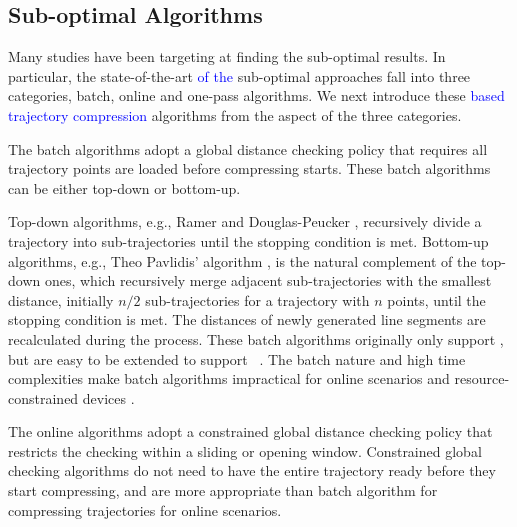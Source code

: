 \vspace{-1ex}
\subsection{Sub-optimal Algorithms}
Many studies have been targeting at finding the sub-optimal results.
In particular, the state-of-the-art \textcolor{blue}{of the} sub-optimal \lsa approaches fall into three categories, \ie batch, online and one-pass algorithms.
We next introduce these \lsa \textcolor{blue}{based trajectory compression} algorithms from the aspect of the three categories.

The batch algorithms adopt a global distance checking policy that requires all trajectory points are loaded before compressing starts.
These batch algorithms can be either top-down or bottom-up.

Top-down algorithms, e.g., Ramer \cite{Ramer:Split} and Douglas-Peucker \cite{Douglas:Peucker}, recursively divide a trajectory into sub-trajectories until the stopping condition is met.
%
Bottom-up algorithms, e.g., Theo Pavlidis' algorithm \cite{Pavlidis:Segment}, is the natural complement of the top-down ones, which recursively merge adjacent sub-trajectories with the smallest distance, initially $n/2$  sub-trajectories for a trajectory with $n$ points, until the stopping condition is met.
%
The distances of newly generated line segments are recalculated during the process.
%
These batch algorithms originally only support \ped, but are easy to be extended to support \sed~\cite{Meratnia:Spatiotemporal}.
%
The batch nature and high time complexities make batch algorithms impractical for online scenarios and resource-constrained devices \cite{Lin:Operb}.


The online algorithms adopt a constrained global distance checking policy that restricts the checking within a sliding or opening window.
Constrained global checking algorithms do not need to have the entire trajectory ready before they start compressing, and are more appropriate than batch algorithm for compressing trajectories for online scenarios.

